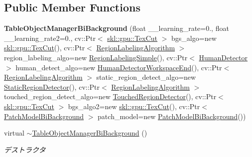 \subsection*{Public Member Functions}
\begin{DoxyCompactItemize}
\item 
\hypertarget{classskl_1_1gpu_1_1_table_object_manager_bi_background_a35b6b810cf8ef75b8be109f23907fd12}{}\label{classskl_1_1gpu_1_1_table_object_manager_bi_background_a35b6b810cf8ef75b8be109f23907fd12} 
{\bfseries Table\+Object\+Manager\+Bi\+Background} (float \+\_\+\+\_\+learning\+\_\+rate=0., float \+\_\+\+\_\+learning\+\_\+rate2=0., cv\+::\+Ptr$<$ \hyperlink{classskl_1_1gpu_1_1_tex_cut}{skl\+::gpu\+::\+Tex\+Cut} $>$ bgs\+\_\+algo=new \hyperlink{classskl_1_1gpu_1_1_tex_cut}{skl\+::gpu\+::\+Tex\+Cut}(), cv\+::\+Ptr$<$ \hyperlink{classskl_1_1_filter_mat2_mat}{Region\+Labeling\+Algorithm} $>$ region\+\_\+labeling\+\_\+algo=new \hyperlink{classskl_1_1_region_labeling_simple}{Region\+Labeling\+Simple}(), cv\+::\+Ptr$<$ \hyperlink{classskl_1_1_filter_mat2_mat}{Human\+Detector} $>$ human\+\_\+detect\+\_\+algo=new \hyperlink{classskl_1_1_human_detector_workspace_end}{Human\+Detector\+Workspace\+End}(), cv\+::\+Ptr$<$ \hyperlink{classskl_1_1_filter_mat2_mat}{Region\+Labeling\+Algorithm} $>$ static\+\_\+region\+\_\+detect\+\_\+algo=new \hyperlink{classskl_1_1_static_region_detector}{Static\+Region\+Detector}(), cv\+::\+Ptr$<$ \hyperlink{classskl_1_1_filter_mat2_mat}{Region\+Labeling\+Algorithm} $>$ touched\+\_\+region\+\_\+detect\+\_\+algo=new \hyperlink{classskl_1_1_touched_region_detector}{Touched\+Region\+Detector}(), cv\+::\+Ptr$<$ \hyperlink{classskl_1_1gpu_1_1_tex_cut}{skl\+::gpu\+::\+Tex\+Cut} $>$ bgs\+\_\+algo2=new \hyperlink{classskl_1_1gpu_1_1_tex_cut}{skl\+::gpu\+::\+Tex\+Cut}(), cv\+::\+Ptr$<$ \hyperlink{classskl_1_1_patch_model_bi_background}{Patch\+Model\+Bi\+Background} $>$ patch\+\_\+model=new \hyperlink{classskl_1_1_patch_model_bi_background}{Patch\+Model\+Bi\+Background}())
\item 
\hypertarget{classskl_1_1gpu_1_1_table_object_manager_bi_background_aec0a2e4c54a2acdc20577fc849538f6b}{}\label{classskl_1_1gpu_1_1_table_object_manager_bi_background_aec0a2e4c54a2acdc20577fc849538f6b} 
virtual \hyperlink{classskl_1_1gpu_1_1_table_object_manager_bi_background_aec0a2e4c54a2acdc20577fc849538f6b}{$\sim$\+Table\+Object\+Manager\+Bi\+Background} ()
\begin{DoxyCompactList}\small\item\em デストラクタ \end{DoxyCompactList}\item 

\end{DoxyCompactItemize}
